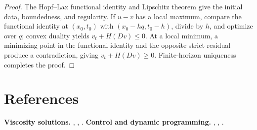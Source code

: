\begin{proof}
\sketch The Hopf--Lax functional identity and Lipschitz theorem give the initial data, boundedness, and regularity. If $u-v$ has a local maximum, compare the functional identity at $(x_0,t_0)$ with $(x_0-hq,t_0-h)$, divide by $h$, and optimize over $q$; convex duality yields $v_t+H(Dv)\leq0$. At a local minimum, a minimizing point in the functional identity and the opposite strict residual produce a contradiction, giving $v_t+H(Dv)\geq0$. Finite-horizon uniqueness completes the proof.
\end{proof}

\section{References}
\label{sec:hj-references}
\textbf{Viscosity solutions.} \cite{CrandallEvansLions1984}, \cite{CrandallLions1983}, \cite{CrandallEvansLions1984}.
\textbf{Control and dynamic programming.} \cite{PLLions1982}, \cite{FlemingSoner1993}, \cite{BardiCapuzzoDolcetta1997}.
